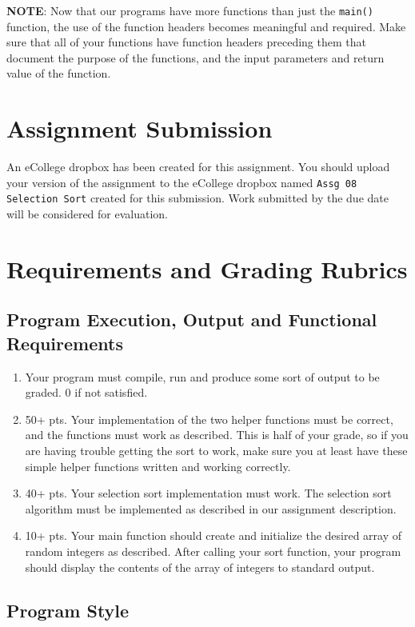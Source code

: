 \documentclass[11pt]{article}
\begin{document}
\textbf{NOTE}: Now that our programs have more functions than just the
\verb~main()~ function, the use of the function headers becomes meaningful
and required.  Make sure that all of your functions have function
headers preceding them that document the purpose of the functions, and
the input parameters and return value of the function.
\section*{Assignment Submission}
\label{sec-4}


An eCollege dropbox has been created for this assignment.  You should
upload your version of the assignment to the eCollege dropbox named
\verb~Assg 08 Selection Sort~ created for this submission.  Work
submitted by the due date will be considered for evaluation.
\section*{Requirements and Grading Rubrics}
\label{sec-5}
\subsection*{Program Execution, Output and Functional Requirements}
\label{sec-5-1}


\begin{enumerate}
\item Your program must compile, run and produce some sort of output to
   be graded. 0 if not satisfied.
\item 50+ pts.  Your implementation of the two helper functions must be
   correct, and the functions must work as described.  This is half of
   your grade, so if you are having trouble getting the sort to work,
   make sure you at least have these simple helper functions written
   and working correctly.
\item 40+ pts. Your selection sort implementation must work.  The
   selection sort algorithm must be implemented as described in our
   assignment description.
\item 10+ pts. Your main function should create and initialize the
   desired array of random integers as described.  After calling your
   sort function, your program should display the contents of the
   array of integers to standard output.
\end{enumerate}
\subsection*{Program Style}
\label{sec-5-2}
\end{document}

